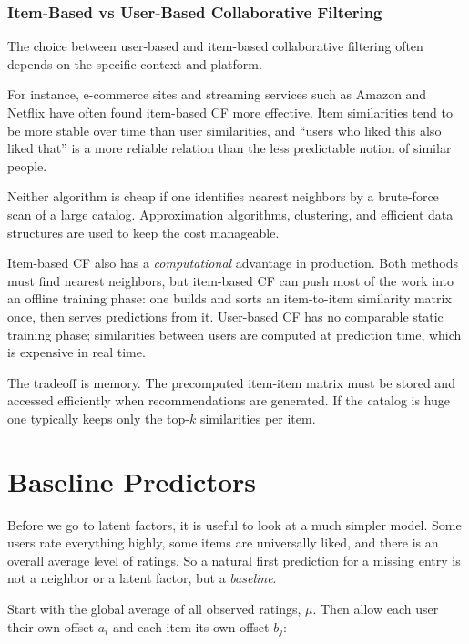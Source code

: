 \documentclass[
]{book}
\begin{document}
\subsubsection*{Item-Based vs User-Based Collaborative Filtering}\label{item-based-vs-user-based-collaborative-filtering}

The choice between user-based and item-based collaborative filtering often depends on the specific context and platform.

For instance, e-commerce sites and streaming services such as Amazon and Netflix have often found item-based CF more effective. Item similarities tend to be more stable over time than user similarities, and ``users who liked this also liked that'' is a more reliable relation than the less predictable notion of similar people.

Neither algorithm is cheap if one identifies nearest neighbors by a brute-force scan of a large catalog. Approximation algorithms, clustering, and efficient data structures are used to keep the cost manageable.

Item-based CF also has a \emph{computational} advantage in production. Both methods must find nearest neighbors, but item-based CF can push most of the work into an offline training phase: one builds and sorts an item-to-item similarity matrix once, then serves predictions from it. User-based CF has no comparable static training phase; similarities between users are computed at prediction time, which is expensive in real time.

The tradeoff is memory. The precomputed item-item matrix must be stored and accessed efficiently when recommendations are generated. If the catalog is huge one typically keeps only the top-\(k\) similarities per item.

\section{Baseline Predictors}\label{baseline-predictors}

Before we go to latent factors, it is useful to look at a much simpler model. Some users rate everything highly, some items are universally liked, and there is an overall average level of ratings. So a natural first prediction for a missing entry is not a neighbor or a latent factor, but a \emph{baseline}.

Start with the global average of all observed ratings, \(\mu\). Then allow each user their own offset \(a_i\) and each item its own offset \(b_j\):
\end{document}

